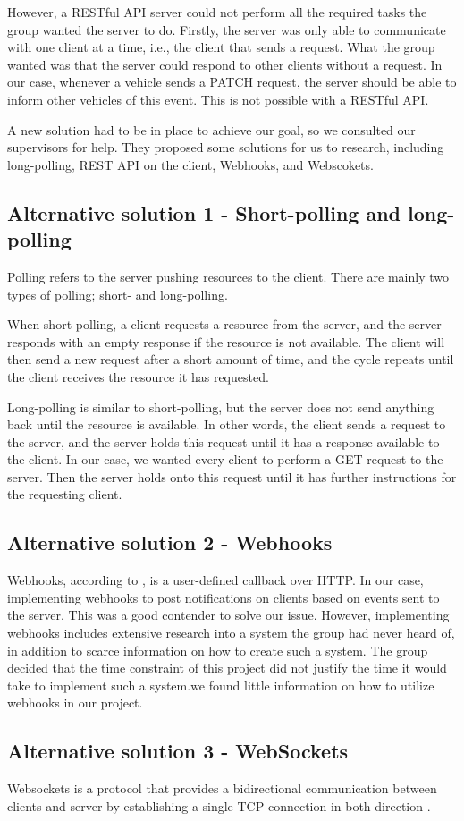 However, a RESTful API server could not perform all the required tasks the group wanted the server to do. Firstly, the server was only able to communicate with one client at a time, i.e., the client that sends a request. What the group wanted was that the server could respond to other clients without a request. In our case, whenever a vehicle sends a PATCH request, the server should be able to inform other vehicles of this event. This is not possible with a RESTful API.

A new solution had to be in place to achieve our goal, so we consulted our supervisors for help. They proposed some solutions for us to research, including long-polling, REST API on the client, Webhooks, and Webscokets. 

\subsection{Alternative solution 1 - Short-polling and long-polling}
Polling refers to the server pushing resources to the client. There are mainly two types of polling; short- and long-polling. 

When short-polling, a client requests a resource from the server, and the server responds with an empty response if the resource is not available. The client will then send a new request after a short amount of time, and the cycle repeats until the client receives the resource it has requested.

Long-polling is similar to short-polling, but the server does not send anything back until the resource is available. In other words, the client sends a request to the server, and the server holds this request until it has a response available to the client. In our case, we wanted every client to perform a GET request to the server. Then the server holds onto this request until it has further instructions for the requesting client.

\subsection{Alternative solution 2 - Webhooks}
Webhooks, according to \cite{webhooks}, is a user-defined callback over HTTP. In our case, implementing webhooks to post notifications on clients based on events sent to the server. This was a good contender to solve our issue. However, implementing webhooks includes extensive research into a system the group had never heard of, in addition to scarce information on how to create such a system. The group decided that the time constraint of this project did not justify the time it would take to implement such a system.we found little information on how to utilize webhooks in our project.                                                                                                                                                                                                                       

\subsection{Alternative solution 3 - WebSockets}
Websockets is a protocol that provides a bidirectional communication between clients and server by establishing a single TCP connection in both direction \parencite{rfc_websockets}.  
